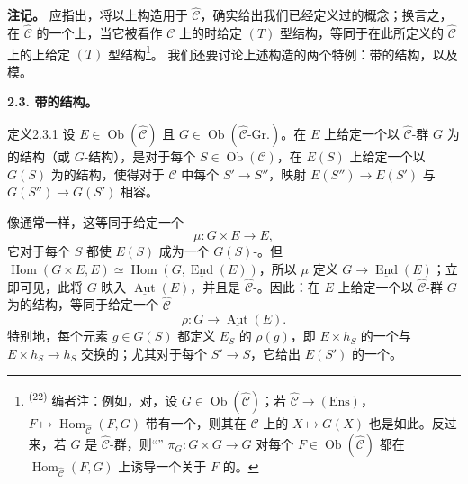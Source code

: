 \textbf{注记。} 应指出，将以上构造用于 $\widehat{\mathcal C}$，确实给出我们已经定义过的概念；换言之，在 $\widehat{\mathcal C}$ 的一个上，当它被看作 $\mathcal C$ 上的时给定 $(T)$ 型结构，等同于在此所定义的 $\widehat{\mathcal C}$ 上的上给定 $(T)$ 型结构\footnote{\textsuperscript{(22)} 编者注：例如，对，设 $G\in\operatorname{Ob}(\widehat{\mathcal C})$；若 $\widehat{\mathcal C}\to(\mathrm{Ens})$，$F\mapsto\operatorname{Hom}_{\widehat{\mathcal C}}(F,G)$ 带有一个，则其在 $\mathcal C$ 上的 $X\mapsto G(X)$ 也是如此。反过来，若 $G$ 是 $\widehat{\mathcal C}$-群，则“” $\pi_G:G\times G\to G$ 对每个 $F\in\operatorname{Ob}(\widehat{\mathcal C})$ 都在 $\operatorname{Hom}_{\widehat{\mathcal C}}(F,G)$ 上诱导一个关于 $F$ 的。}。
我们还要讨论上述构造的两个特例：带的结构，以及模。

\textbf{2.3. 带的结构。}
\begin{SGAresult}{定义}{2.3.1}
设 $E\in\operatorname{Ob}(\widehat{\mathcal C})$ 且 $G\in\operatorname{Ob}(\widehat{\mathcal C}\text{-}\mathrm{Gr.})$。在 $E$ 上给定一个以 $\widehat{\mathcal C}$-群 $G$ 为的结构（或 $G$-结构），是对于每个 $S\in\operatorname{Ob}(\mathcal C)$，在 $E(S)$ 上给定一个以 $G(S)$ 为的结构，使得对于 $\mathcal C$ 中每个 $S'\to S''$，映射 $E(S'')\to E(S')$ 与 $G(S'')\to G(S')$ 相容。
\end{SGAresult}
像通常一样，这等同于给定一个
\[
\mu:G\times E\longrightarrow E,
\]
它对于每个 $S$ 都使 $E(S)$ 成为一个 $G(S)$-。但 $\operatorname{Hom}(G\times E,E)\simeq\operatorname{Hom}(G,\underline{\operatorname{End}}(E))$，所以 $\mu$ 定义 $G\to\underline{\operatorname{End}}(E)$；立即可见，此将 $G$ 映入 $\underline{\operatorname{Aut}}(E)$，并且是 $\widehat{\mathcal C}$-。因此：在 $E$ 上给定一个以 $\widehat{\mathcal C}$-群 $G$ 为的结构，等同于给定一个 $\widehat{\mathcal C}$-
\[
\rho:G\longrightarrow\underline{\operatorname{Aut}}(E).
\]
特别地，每个元素 $g\in G(S)$ 都定义 $E_S$ 的 $\rho(g)$，即 $E\times h_S$ 的一个与 $E\times h_S\to h_S$ 交换的；尤其对于每个 $S'\to S$，它给出 $E(S')$ 的一个。

